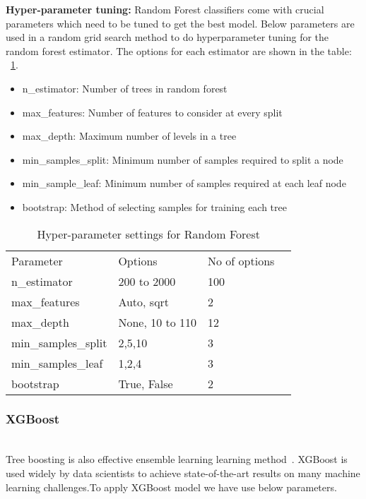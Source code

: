 \textbf{Hyper-parameter tuning:}
Random Forest classifiers come with crucial parameters which need to be tuned to get the best model. Below parameters are used in a random grid search method to do hyperparameter tuning for the random forest estimator. The options for each estimator are shown in the table: ~\ref{tab:RF_param}.

\begin{itemize}
    \item n\_estimator: Number of trees in random forest
    \item max\_features: Number of features to consider at every split
    \item max\_depth: Maximum number of levels in a tree
    \item min\_samples\_split: Minimum number of samples required to split a node
    \item min\_sample\_leaf: Minimum number of samples required at each leaf node
    \item bootstrap: Method of selecting samples for training each tree
\end{itemize}

\begin{table}[h]
    \begin{tabular}{llll}
    Parameter           & Options         & No of options \\
    n\_estimator        & 200 to 2000     & 100           \\
    max\_features       & Auto, sqrt      & 2             \\
    max\_depth          & None, 10 to 110 & 12            \\
    min\_samples\_split & 2,5,10          & 3              \\
    min\_samples\_leaf  & 1,2,4           & 3              \\
    bootstrap           & True, False     & 2              \\
    \end{tabular}
    \caption{Hyper-parameter settings for Random Forest}
    \label{tab:RF_param}
\end{table}


\subsubsection{XGBoost}\hspace*{\fill} \\
Tree boosting is also effective ensemble learning learning method~\cite{2016}. XGBoost is used widely by data scientists to achieve state-of-the-art results on many machine learning challenges.To apply XGBoost model we have use below parameters. 

